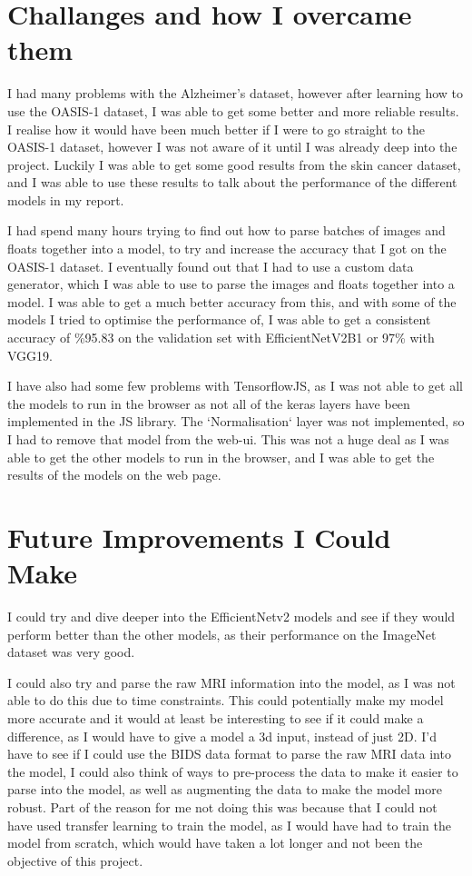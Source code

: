 \documentclass[]{final_report}
\begin{document}
\section{Challanges and how I overcame them}

I had many problems with the Alzheimer's dataset, however after learning how to use the OASIS-1 dataset, I was able to get some better and more reliable results. I realise how it would have been much better if I were to go straight to the OASIS-1 dataset, however I was not aware of it until I was already deep into the project. Luckily I was able to get some good results from the skin cancer dataset, and I was able to use these results to talk about the performance of the different models in my report.

I had spend many hours trying to find out how to parse batches of images and floats together into a model, to try and increase the accuracy that I got on the OASIS-1 dataset. I eventually found out that I had to use a custom data generator, which I was able to use to parse the images and floats together into a model. I was able to get a much better accuracy from this, and with some of the models I tried to optimise the performance of, I was able to get a consistent accuracy of \%95.83 on the validation set with EfficientNetV2B1 or 97\% with VGG19.

I have also had some few problems with TensorflowJS\cite{smilkov2019tensorflowjs}, as I was not able to get all the models to run in the browser as not all of the keras layers have been implemented in the JS library. The `Normalisation` layer was not implemented, so I had to remove that model from the web-ui. This was not a huge deal as I was able to get the other models to run in the browser, and I was able to get the results of the models on the web page.

\section{Future Improvements I Could Make}

I could try and dive deeper into the EfficientNetv2 models and see if they would perform better than the other models, as their performance on the ImageNet\cite{ImageNet} dataset was very good. 

I could also try and parse the raw MRI information into the model, as I was not able to do this due to time constraints. This could potentially make my model more accurate and it would at least be interesting to see if it could make a difference, as I would have to give a model a 3d input, instead of just 2D. I'd have to see if I could use the BIDS data format to parse the raw MRI data into the model, I could also think of ways to pre-process the data to make it easier to parse into the model, as well as augmenting the data to make the model more robust. Part of the reason for me not doing this was because that I could not have used transfer learning to train the model, as I would have had to train the model from scratch, which would have taken a lot longer and not been the objective of this project.
\end{document}
